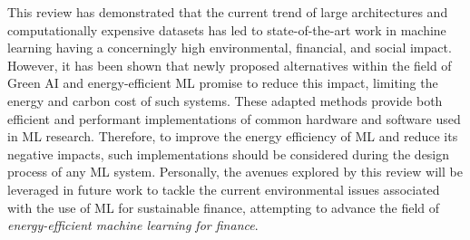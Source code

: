 \documentclass[a4paper, 12pt]{article}
\begin{document}
    This review has demonstrated that the current trend of large architectures and computationally expensive datasets has led to state-of-the-art work in machine learning having a concerningly high environmental, financial, and social impact. However, it has been shown that newly proposed alternatives within the field of Green AI and energy-efficient ML promise to reduce this impact, limiting the energy and carbon cost of such systems. These adapted methods provide both efficient and performant implementations of common hardware and software used in ML research. Therefore, to improve the energy efficiency of ML and reduce its negative impacts, such implementations should be considered during the design process of any ML system. Personally, the avenues explored by this review will be leveraged in future work to tackle the current environmental issues associated with the use of ML for sustainable finance, attempting to advance the field of \emph{energy-efficient machine learning for finance}.


    
\end{document}
